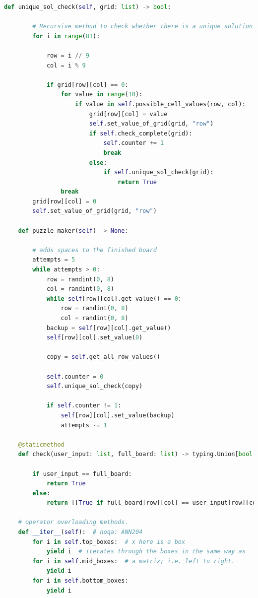 \documentclass[12pt, a4paper]{report}
\begin{document}
\begin{lstlisting}[language=Python, caption=utils/classes.py]
    def unique_sol_check(self, grid: list) -> bool:

        # Recursive method to check whether there is a unique solution for a number removed from grid
        for i in range(81):

            row = i // 9
            col = i % 9

            if grid[row][col] == 0:
                for value in range(10):
                    if value in self.possible_cell_values(row, col):
                        grid[row][col] = value
                        self.set_value_of_grid(grid, "row")
                        if self.check_complete(grid):
                            self.counter += 1
                            break
                        else:
                            if self.unique_sol_check(grid):
                                return True
                break
        grid[row][col] = 0
        self.set_value_of_grid(grid, "row")

    def puzzle_maker(self) -> None:

        # adds spaces to the finished board
        attempts = 5
        while attempts > 0:
            row = randint(0, 8)
            col = randint(0, 8)
            while self[row][col].get_value() == 0:
                row = randint(0, 8)
                col = randint(0, 8)
            backup = self[row][col].get_value()
            self[row][col].set_value(0)

            copy = self.get_all_row_values()

            self.counter = 0
            self.unique_sol_check(copy)

            if self.counter != 1:
                self[row][col].set_value(backup)
                attempts -= 1
    
    @staticmethod
    def check(user_input: list, full_board: list) -> typing.Union[bool, list]:

        if user_input == full_board:
            return True
        else:
            return [[True if full_board[row][col] == user_input[row][col] else False for col in range(9)] for row in range(9)]

    # operator overloading methods.
    def __iter__(self):  # noqa: ANN204
        for i in self.top_boxes:  # x here is a box
            yield i  # iterates through the boxes in the same way as
        for i in self.mid_boxes:  # a matrix; i.e. left to right.
            yield i
        for i in self.bottom_boxes:
            yield i


\end{lstlisting}
\end{document}
